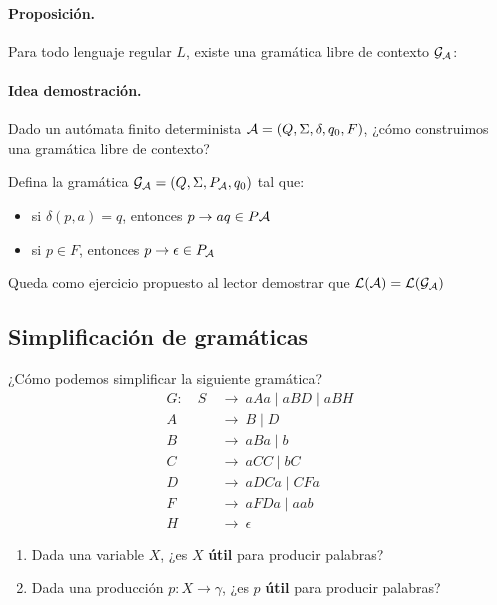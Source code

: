 \paragraph{Proposición.} Para todo lenguaje regular $L$, existe una gramática libre de contexto $\mathcal{G}_{\mathcal{A}}$:

\paragraph{Idea demostración.} Dado un autómata finito determinista $\mathcal{A} = (Q, \Sigma, \delta, q_0, F)$, ¿cómo construimos una gramática libre de contexto? \medbreak

Defina la gramática $\mathcal{G}_{\mathcal{A}} = (Q, \Sigma, P_{\mathcal{A}}, q_0)$ tal que:
\begin{itemize}
    \item si $\delta(p,a) = q$, entonces $p \to aq \in P\mathcal{A}$
    \item si $p \in F$, entonces $p \to \epsilon \in P_{\mathcal{A}}$
\end{itemize}

Queda como ejercicio propuesto al lector demostrar que $\mathcal{L}(\mathcal{A}) = \mathcal{L}(\mathcal{G}_{\mathcal{A}})$

\subsection{Simplificación de gramáticas}

¿Cómo podemos simplificar la siguiente gramática?
\begin{align*}
    G: \quad S \  & \to \ aAa \mid aBD \mid aBH \\
    A \           & \to \ B \mid D              \\
    B \           & \to \ aBa \mid b            \\
    C \           & \to \ aCC \mid bC           \\
    D \           & \to \ aDCa \mid CFa         \\
    F \           & \to \ aFDa \mid aab         \\
    H \           & \to \ \epsilon
\end{align*}
\begin{enumerate}
    \item Dada una variable $X$, ¿es $X$ \textbf{útil} para producir palabras?
    \item Dada una producción $p:X \to \gamma$, ¿es $p$ \textbf{útil} para producir palabras?
\end{enumerate}

